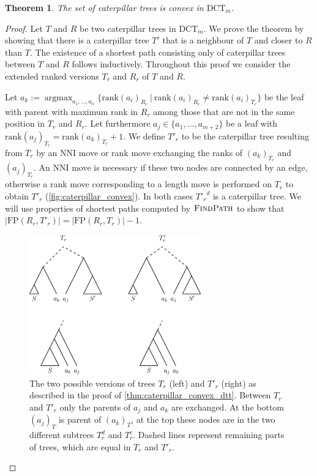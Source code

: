 \documentclass[11pt]{amsart}
\newtheorem{theorem}{Theorem}
\newcommand{\findpath}{\textsc{FindPath}}
\newcommand{\rank}{\mathrm{rank}}
\newcommand{\nni}{\mathrm{NNI}}
\newcommand{\fp}{\mathrm{FP}}
\newcommand{\dtt}{\mathrm{DCT}}
\DeclareMathOperator*{\argmax}{argmax}
\begin{document}
\begin{theorem}
	The set of caterpillar trees is convex in $\dtt_m$.
	\label{thm:caterpillar_convex_dtt}
\end{theorem}

\begin{proof}
	Let $T$ and $R$ be two caterpillar trees in $\dtt_m$.
	We prove the theorem by showing that there is a caterpillar tree $T'$ that is a neighbour of $T$ and closer to $R$ than $T$.
	The existence of a shortest path consisting only of caterpillar trees between $T$ and $R$ follows inductively.
	Throughout this proof we consider the extended ranked versions $T_r$ and $R_r$ of $T$ and $R$.

	Let $a_k := \argmax_{a_1, \ldots, a_n}\{\rank(a_i)_{R_r} \ |\  \rank(a_i)_{R_r} \neq \rank(a_i)_{T_r}\}$ be the leaf with parent with maximum rank in $R_r$ among those that are not in the same position in $T_r$ and $R_r$.
	Let furthermore $a_j \in \{a_1, \ldots, a_{m+2}\}$ be a leaf with $\rank(a_j)_{T_r} = \rank(a_k)_{T_r} + 1$.
	We define $T'_r$ to be the caterpillar tree resulting from $T_r$ by an $\nni$ move or rank move exchanging the ranks of $(a_k)_{T_r}$ and $(a_j)_{T_r}$.
	An $\nni$ move is necessary if these two nodes are connected by an edge, otherwise a rank move corresponding to a length move is performed on $T_r$ to obtain $T'_r$ (\autoref{fig:caterpillar_convex}).
	In both cases ${T'_r}^d$ is a caterpillar tree.
	We will use properties of shortest paths computed by $\findpath$ to show that $|\fp(R_r,T'_r)| = |\fp(R_r,T_r)| - 1$.

	\begin{figure}[ht]
		\includegraphics[width=0.66\textwidth]{caterpillar_convex.eps}
		\caption{The two possible versions of trees $T_r$ (left) and $T'_r$ (right) as described in the proof of \autoref{thm:caterpillar_convex_dtt}.
		Between $T_r$ and $T'_r$ only the parents of $a_j$ and $a_k$ are exchanged.
		At the bottom $(a_j)_T$ is parent of $(a_k)_T$, at the top these nodes are in the two different subtrees $T_r^d$ and $T_r^c$.
		Dashed lines represent remaining parts of trees, which are equal in $T_r$ and $T'_r$.}
		\label{fig:caterpillar_convex}
	\end{figure}


\end{proof}
\end{document}
